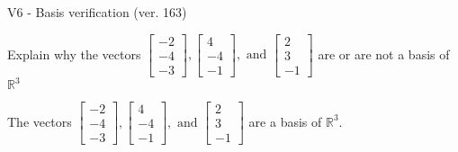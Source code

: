 \begin{exercise}
  \begin{exerciseTitle}V6 - Basis verification (ver. 163)\end{exerciseTitle}
  \begin{exerciseStatement}
    Explain why the vectors \(\left[\begin{array}{r}
-2 \\
-4 \\
-3
\end{array}\right] , \left[\begin{array}{r}
4 \\
-4 \\
-1
\end{array}\right] , \text{ and } \left[\begin{array}{r}
2 \\
3 \\
-1
\end{array}\right]\) are or are not a basis of \(\mathbb{R}^3\)	


  \end{exerciseStatement}
  \begin{exerciseAnswer}
   The vectors \(\left[\begin{array}{r}
-2 \\
-4 \\
-3
\end{array}\right] , \left[\begin{array}{r}
4 \\
-4 \\
-1
\end{array}\right] , \text{ and } \left[\begin{array}{r}
2 \\
3 \\
-1
\end{array}\right]\) 
  	 are  a basis of \(\mathbb{R}^3\).
  


  \end{exerciseAnswer}
\end{exercise}